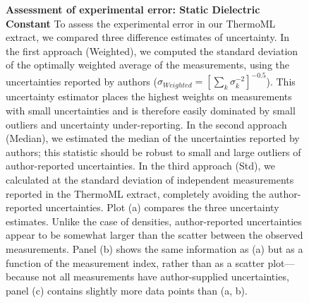 \documentclass[aps,pre,twocolumn,nofootinbib,superscriptaddress,linenumbers]{revtex4-1}
\begin{document}
\begin{figure}



\caption{{\bf Assessment of experimental error: Static Dielectric Constant}
To assess the experimental error in our ThermoML extract, we compared three difference estimates of uncertainty.  
In the first approach (Weighted), we computed the standard deviation of the optimally weighted average of the measurements, using the uncertainties reported by authors ($\sigma_{Weighted} = [\sum_k \sigma_k^{-2}]^{-0.5}$).
This uncertainty estimator places the highest weights on measurements with small uncertainties and is therefore easily dominated by small outliers and uncertainty under-reporting.
In the second approach (Median), we estimated the median of the uncertainties reported by authors; this statistic should be robust to small and large outliers of author-reported uncertainties.
In the third approach (Std), we calculated at the standard deviation of independent measurements reported in the ThermoML extract, completely avoiding the author-reported uncertainties.
Plot (a) compares the three uncertainty estimates.
Unlike the case of densities, author-reported uncertainties appear to be somewhat larger than the scatter between the observed measurements.
Panel (b) shows the same information as (a) but as a function of the measurement index, rather than as a scatter plot---because not all measurements have author-supplied uncertainties, panel (c) contains slightly more data points than (a, b).  
}
\label{figure:ErrorAnalysisDielectric}

\end{figure}
\end{document}
